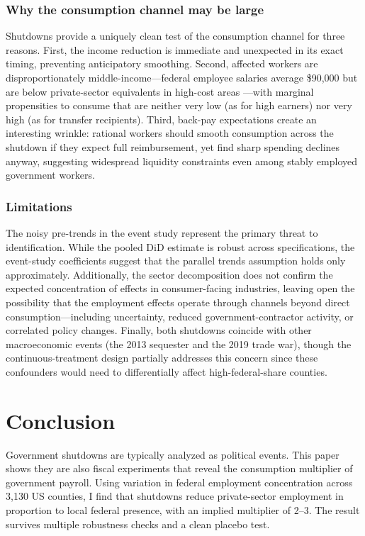 \documentclass[12pt]{article}
\begin{document}
\subsubsection*{Why the consumption channel may be large} Shutdowns provide a uniquely clean test of the consumption channel for three reasons. First, the income reduction is immediate and unexpected in its exact timing, preventing anticipatory smoothing. Second, affected workers are disproportionately middle-income---federal employee salaries average \$90,000 but are below private-sector equivalents in high-cost areas \citep{opm2023}---with marginal propensities to consume that are neither very low (as for high earners) nor very high (as for transfer recipients). Third, back-pay expectations create an interesting wrinkle: rational workers should smooth consumption across the shutdown if they expect full reimbursement, yet \citet{gelman2023government} find sharp spending declines anyway, suggesting widespread liquidity constraints even among stably employed government workers.

\subsubsection*{Limitations} The noisy pre-trends in the event study represent the primary threat to identification. While the pooled DiD estimate is robust across specifications, the event-study coefficients suggest that the parallel trends assumption holds only approximately. Additionally, the sector decomposition does not confirm the expected concentration of effects in consumer-facing industries, leaving open the possibility that the employment effects operate through channels beyond direct consumption---including uncertainty, reduced government-contractor activity, or correlated policy changes. Finally, both shutdowns coincide with other macroeconomic events (the 2013 sequester and the 2019 trade war), though the continuous-treatment design partially addresses this concern since these confounders would need to differentially affect high-federal-share counties.

\section{Conclusion}

Government shutdowns are typically analyzed as political events. This paper shows they are also fiscal experiments that reveal the consumption multiplier of government payroll. Using variation in federal employment concentration across 3,130 US counties, I find that shutdowns reduce private-sector employment in proportion to local federal presence, with an implied multiplier of 2--3. The result survives multiple robustness checks and a clean placebo test.
\end{document}
